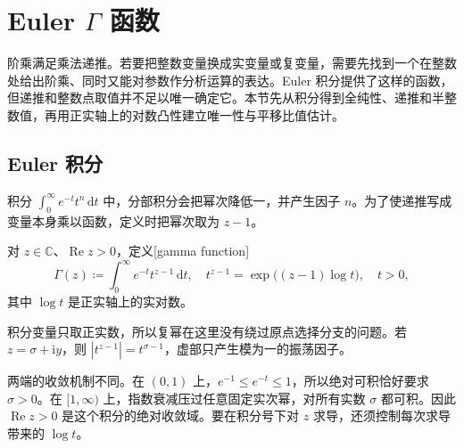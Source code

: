 \section{Euler \texorpdfstring{\(\Gamma\)}{\AnalysisPdfGamma} 函数}
\label{b3:sec:2101}

阶乘满足乘法递推。若要把整数变量换成实变量或复变量，需要先找到一个在整数处给出阶乘、同时又能对参数作分析运算的表达。Euler 积分提供了这样的函数，但递推和整数点取值并不足以唯一确定它。本节先从积分得到全纯性、递推和半整数值，再用正实轴上的对数凸性建立唯一性与平移比值估计。

\subsection{Euler 积分}
\label{b3:subsec:210101}

积分 \(\int_0^\infty e^{-t}t^n\,\mathrm{d}t\) 中，分部积分会把幂次降低一，并产生因子 \(n\)。为了使递推写成变量本身乘以函数，定义时把幂次取为 \(z-1\)。

\begin{definition}\label{b3:def:21-gamma}
对 \(z\in\mathbb C\)、\(\operatorname{Re}z>0\)，定义[gamma function]
\[
 \Gamma(z)\coloneqq\int_0^\infty e^{-t}t^{z-1}\,\mathrm{d}t,
 \quad t^{z-1}=\exp\bigl((z-1)\log t\bigr),\quad t>0,
\]
其中 \(\log t\) 是正实轴上的实对数。
\end{definition}
积分变量只取正实数，所以复幂在这里没有绕过原点选择分支的问题。若 \(z=\sigma+\mathrm{i}y\)，则 \(|t^{z-1}|=t^{\sigma-1}\)，虚部只产生模为一的振荡因子。

\ProseParagraphBreak

两端的收敛机制不同。在 \((0,1)\) 上，\(e^{-1}\le e^{-t}\le1\)，所以绝对可积恰好要求 \(\sigma>0\)。在 \([1,\infty)\) 上，指数衰减压过任意固定实次幂，对所有实数 \(\sigma\) 都可积。因此 \(\operatorname{Re}z>0\) 是这个积分的绝对收敛域。要在积分号下对 \(z\) 求导，还须控制每次求导带来的 \(\log t\)。

